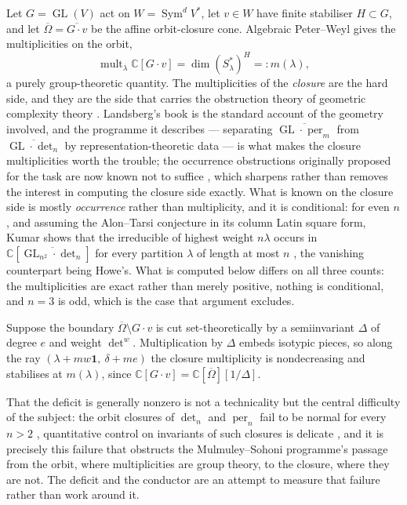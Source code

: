 \documentclass[11pt,reqno]{amsart}
\theoremstyle{plain}
\theoremstyle{definition}
\DeclareMathOperator{\GL}{GL}
\DeclareMathOperator{\Sym}{Sym}
\DeclareMathOperator{\mult}{mult}
\DeclareMathOperator{\per}{per}
\newcommand{\cO}{\overline{\Omega}}
\newcommand{\bC}{\mathbb{C}}
\begin{document}
Let $G=\GL(V)$ act on $W=\Sym^{d}V^{*}$, let $v\in W$ have finite stabiliser
$H\subset G$, and let $\cO=\overline{G\cdot v}$ be the affine orbit-closure
cone.  Algebraic Peter--Weyl gives the multiplicities on the orbit,
\[
  \mult_\lambda\bC[G\cdot v]=\dim (S_\lambda^{*})^{H}=:m(\lambda),
\]
a purely group-theoretic quantity.  The multiplicities of the \emph{closure}
are the hard side, and they are the side that carries the obstruction theory
of geometric complexity theory \cite{MS,BIP,IK}.  Landsberg's book
\cite{Lands} is the standard account of the geometry involved, and the
programme it describes --- separating $\overline{\GL\cdot\per_m}$ from
$\overline{\GL\cdot\det_n}$ by representation-theoretic data --- is what makes
the closure multiplicities worth the trouble; the occurrence obstructions
originally proposed for the task are now known not to suffice \cite{BIP}, which
sharpens rather than removes the interest in computing the closure side
exactly.  What is known on the closure side is mostly \emph{occurrence} rather
than multiplicity, and it is conditional: for even $n$, and assuming the
Alon--Tarsi conjecture in its column Latin square form, Kumar shows that the
irreducible of highest weight $n\lambda$ occurs in
$\bC[\overline{\GL_{n^{2}}\cdot\det_n}]$ for every partition $\lambda$ of
length at most $n$ \cite[Cor.~6.2]{KumarComp}, the vanishing counterpart being
Howe's.  What is computed below differs on all three counts: the
multiplicities are exact rather than merely positive, nothing is conditional,
and $n=3$ is odd, which is the case that argument excludes.

Suppose the boundary $\cO\setminus G\cdot v$ is cut set-theoretically by a
semiinvariant $\Delta$ of degree $e$ and weight $\det^{w}$.  Multiplication by
$\Delta$ embeds isotypic pieces, so along the ray
$(\lambda+mw\mathbf 1,\ \delta+me)$ the closure multiplicity is nondecreasing
and stabilises at $m(\lambda)$, since $\bC[G\cdot v]=\bC[\cO][1/\Delta]$.

That the deficit is generally nonzero is not a technicality but the central
difficulty of the subject: the orbit closures of $\det_n$ and $\per_n$ fail to
be normal for every $n>2$ \cite{KumarCMH}, quantitative control on invariants
of such closures is delicate \cite{DM}, and it is precisely this failure
that obstructs the Mulmuley--Sohoni programme's passage from the orbit, where
multiplicities are group theory, to the closure, where they are not.  The
deficit and the conductor are an attempt to measure that failure rather than
work around it.
\end{document}
